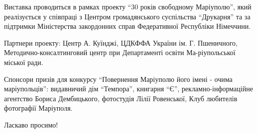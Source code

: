 Виставка проводиться в рамках проекту \enquote{30 років свободному Маріуполю},
який реалізується у співпраці з Центром громадянського суспільства
\enquote{Друкарня} та за підтримки Міністерства закордонних справ Федеративної
Республіки Німеччини. 

Партнери проекту: Центр А. Куїнджі, ЦДКФФА України ім. Г. Пшеничного,
Методично-консалтинговий центр при Департаменті освіти Ма\hyp{}ріупольської міської
ради.  

Спонсори призів для конкурсу \enquote{Повернення Маріуполю його імені - очима
маріупольців}: видавничий дім \enquote{Темпора}, книгарня \enquote{Є},
рекламно-інформаційне агентство Бориса Дембицького, фотостудія Лілії
Ровенської, Клуб любителів фотографії Маріуполя. 

Ласкаво просимо!

